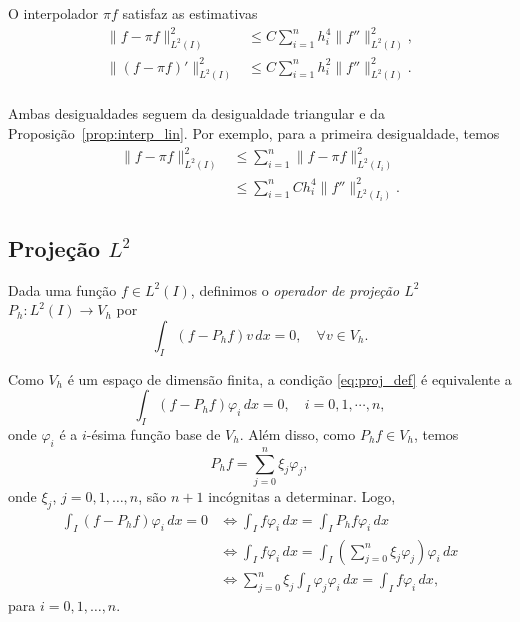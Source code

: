 \begin{prop}\label{prop:interp_linpartes}
  O interpolador $\pi f$ satisfaz as estimativas
  \begin{align}
    \|f-\pi f\|_{L^2(I)}^2 &\leq C\sum_{i=1}^n h_i^4\|f''\|_{L^2(I)}^2,\\
    \|(f-\pi f)'\|_{L^2(I)}^2 &\leq C\sum_{i=1}^n h_i^2\|f''\|_{L^2(I)}^2.\\
  \end{align}
\end{prop}
\begin{dem}
  Ambas desigualdades seguem da desigualdade triangular e da Proposição~\ref{prop:interp_lin}. Por exemplo, para a primeira desigualdade, temos
  \begin{align}
    \|f - \pi f\|_{L^2(I)}^2 &\leq \sum_{i=1}^n \|f - \pi f\|_{L^2(I_i)}^2\\
    &\leq \sum_{i=1}^n Ch_i^4 \|f''\|_{L^2(I_i)}^2.
  \end{align}
\end{dem}

\subsection{Projeção $L^2$}

Dada uma função $f\in L^2(I)$, definimos o \emph{operador de projeção $L^2$} $P_h:L^2(I)\to V_h$ por
\begin{equation}\label{eq:proj_def}
  \int_I (f-P_hf)v\,dx=0,\quad\forall v\in V_h.
\end{equation}

Como $V_h$ é um espaço de dimensão finita, a condição \eqref{eq:proj_def} é equivalente a
\begin{equation}\label{eq:proj_def}
  \int_I (f-P_hf)\varphi_i\,dx=0,\quad i=0, 1, \cdots, n,
\end{equation}
onde $\varphi_i$ é a $i$-ésima função base de $V_h$. Além disso, como $P_hf\in V_h$, temos
\begin{equation}
  P_hf = \sum_{j=0}^n\xi_j\varphi_j,
\end{equation}
onde $\xi_j$, $j=0, 1, \dotsc, n$, são $n+1$ incógnitas a determinar. Logo,
\begin{align}
  \int_I (f-P_hf)\varphi_i\,dx=0 &\Leftrightarrow \int_I f\varphi_i\,dx = \int_I P_hf\varphi_i\,dx\\
  &\Leftrightarrow \int_I f\varphi_i\,dx = \int_I \left(\sum_{j=0}^n \xi_j\varphi_j\right)\varphi_i\,dx\\
  &\Leftrightarrow \sum_{j=0}^n \xi_j\int_I\varphi_j\varphi_i\,dx = \int_I f\varphi_i\,dx,\label{eq:proj_siseq}
\end{align}
para $i=0, 1, \dotsc, n$.

